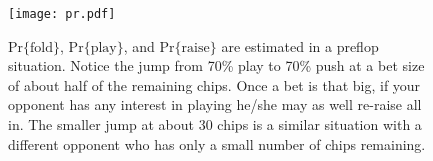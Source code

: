 \begin{figure}[htb]
 \begin{center}
      \texttt{[image: pr.pdf]} 
 \end{center}
 \caption[$\mathrm{Pr\{fold\}}$, $\mathrm{Pr\{play\}}$, and $\mathrm{Pr\{raise\}}$]{ $\mathrm{Pr\{fold\}}$, $\mathrm{Pr\{play\}}$, and $\mathrm{Pr\{raise\}}$ are estimated in a preflop situation. Notice the jump from 70\% play to 70\% push at a bet size of about half of the remaining chips. Once a bet is that big, if your opponent has any interest in playing he/she may as well re-raise all in. The smaller jump at about 30 chips is a similar situation with a different opponent who has only a small number of chips remaining.}
 \label{fig:Pr}
\end{figure}

